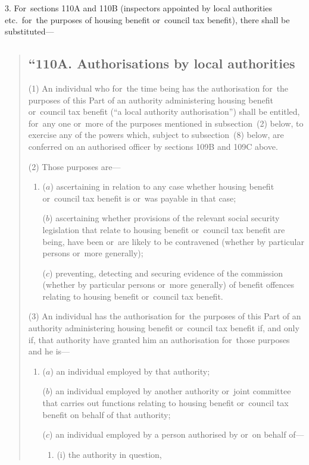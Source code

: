 \documentclass[12pt,a4paper]{article}
\begin{document}
3. For~sections 110A and 110B (inspectors appointed by local authorities etc.\ for~the purposes of housing benefit or~council tax benefit), there shall be substituted—
\begin{quotation}
\subsection*{“110A. Authorisations by local authorities}

(1) An individual who for~the time being has the authorisation for~the purposes of this Part of an authority administering housing benefit or~council tax benefit (“a local authority authorisation”) shall be entitled, for~any one or~more of the purposes mentioned in subsection~(2)  below, to exercise any of the powers which, subject to subsection~(8)  below, are conferred on an authorised officer by sections 109B and 109C above.

(2) Those purposes are—
\begin{enumerate}\item[]
($a$) ascertaining in relation to any case whether housing benefit or~council tax benefit is or~was payable in that case;

($b$) ascertaining whether provisions of the relevant social security legislation that relate to housing benefit or~council tax benefit are being, have been or~are likely to be contravened (whether by particular persons or~more generally);

($c$) preventing, detecting and securing evidence of the commission (whether by particular persons or~more generally) of benefit offences relating to housing benefit or~council tax benefit.
\end{enumerate}

(3) An individual has the authorisation for~the purposes of this Part of an authority administering housing benefit or~council tax benefit if, and only if, that authority have granted him an authorisation for~those purposes and he is—
\begin{enumerate}\item[]
($a$) an individual employed by that authority;

($b$) an individual employed by another authority or~joint committee that carries out functions relating to housing benefit or~council tax benefit on behalf of that authority;

($c$) an individual employed by a person authorised by or~on behalf of—
\begin{enumerate}\item[]
(i) the authority in question,


\end{enumerate}
\end{enumerate}
\end{quotation}
\end{document}
